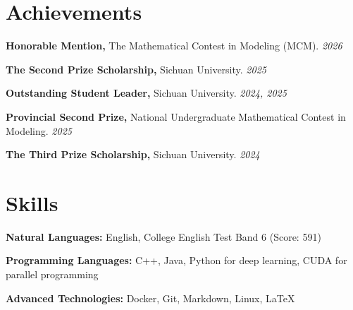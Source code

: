 \documentclass[10pt]{article}
\begin{document}
\section{Achievements}
\textbf{Honorable Mention,} The Mathematical Contest in Modeling (MCM). \hfill \textit{2026}

\vspace{0.055cm}

\textbf{The Second Prize Scholarship,} Sichuan University. \hfill \textit{2025}

\vspace{0.055cm}

\textbf{Outstanding Student Leader,} Sichuan University. \hfill \textit{2024, 2025}

\vspace{0.055cm}

\textbf{Provincial Second Prize,} National Undergraduate Mathematical Contest in Modeling. \hfill \textit{2025}

\vspace{0.055cm}

\textbf{The Third Prize Scholarship,} Sichuan University. \hfill \textit{2024}

\section{Skills}
\textbf{Natural Languages:} English, College English Test Band 6 (Score: 591)

\vspace{0.055cm}

\textbf{Programming Languages:} C++, Java, Python for deep learning, CUDA for parallel programming

\vspace{0.055cm}

\textbf{Advanced Technologies:} Docker, Git, Markdown, Linux, \LaTeX
\end{document}
